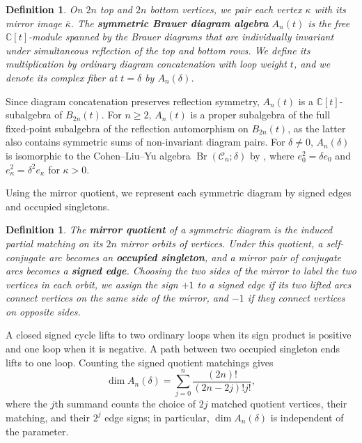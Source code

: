 \documentclass[11pt,a4paper]{amsart}
\newcommand{\Br}{\operatorname{Br}}\newcommand{\Irr}{\operatorname{Irr}}
\theoremstyle{uprightdefinition}
\newtheorem{definition}[theorem]{Definition}
\theoremstyle{remark}\newtheorem{remark}[theorem]{Remark}
\begin{document}
\begin{definition}\label{def:symmetric-brauer}
\cite[Definition~2.5]{CLY2012}
On $2n$ top and $2n$ bottom vertices, we pair each vertex $\kappa$ with its mirror image $\bar\kappa$. The \textbf{symmetric Brauer diagram algebra}
$A_n(t)$ is the free $\mathbb C[t]$-module spanned by the Brauer diagrams that are
individually invariant under simultaneous reflection of the top and bottom rows.
We define its multiplication by ordinary diagram concatenation with loop weight $t$,
and we denote its complex fiber at $t=\delta$ by $A_n(\delta)$.
\end{definition}

Since diagram concatenation preserves reflection symmetry, $A_n(t)$ is
a $\mathbb C[t]$-subalgebra of $B_{2n}(t)$. For $n\ge2$, $A_n(t)$ is a proper subalgebra of the full
fixed-point subalgebra of the reflection automorphism on $B_{2n}(t)$, as the latter also
contains symmetric sums of non-invariant diagram pairs. For $\delta\ne0$, $A_n(\delta)$ is isomorphic to
the Cohen--Liu--Yu algebra $\Br(\mathscr{C}_n;\delta)$ by
\cite[Theorem~1.1]{CLY2012}, where
$e_0^2=\delta e_0$ and $e_\kappa^2=\delta^2e_\kappa$ for $\kappa>0$.

Using the mirror quotient, we represent each symmetric diagram by
signed edges and occupied singletons.
\begin{definition}\label{def:mirror-quotient}
The \textbf{mirror quotient} of a symmetric diagram is the induced partial
matching on its $2n$ mirror orbits of vertices. Under this quotient, a self-conjugate arc becomes an
\textbf{occupied singleton}, and a mirror pair of conjugate arcs becomes a
\textbf{signed edge}. Choosing the two sides of the mirror to label the two
vertices in each orbit, we assign the sign $+1$ to a signed edge if its two lifted
arcs connect vertices on the same side of the mirror, and $-1$
if they connect vertices on opposite sides.
\end{definition}

A closed signed cycle lifts
to two ordinary loops when its sign product is positive and one loop when
it is negative. A path between two occupied singleton ends lifts to one loop.
Counting the signed quotient matchings gives
\begin{equation}\label{eq:dimension}
 \dim A_n(\delta)=\sum_{j=0}^n\frac{(2n)!}{(2n-2j)!j!},
\end{equation}
where the $j$th summand counts the choice of $2j$ matched quotient vertices, their matching,
and their $2^j$ edge signs; in particular, $\dim A_n(\delta)$ is independent of the parameter.
\end{document}
